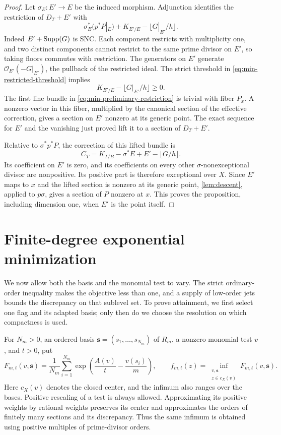 \begin{proof}
Let $\sigma_E:E'\longrightarrow E$ be the induced morphism. Adjunction identifies the restriction of $D_T+E'$ with
\begin{equation}
\label{eq:min-preliminary-restriction}
 \sigma_E^*(p^*P|_E)
   +K_{E'/E}-\lfloor G|_{E'}/h\rfloor.
\end{equation}
Indeed $E'+\operatorname{Supp}(G)$ is SNC. Each component restricts with multiplicity one, and two distinct components cannot restrict to the same prime divisor on $E'$, so taking floors commutes with restriction. The generators on $E'$ generate $\mathcal{O}_{E'}(-G|_{E'})$, the pullback of the restricted ideal. The strict threshold in \eqref{eq:min-restricted-threshold} implies
\[
 K_{E'/E}-\lfloor G|_{E'}/h\rfloor\geq0.
\]
The first line bundle in \eqref{eq:min-preliminary-restriction} is trivial with fiber $P_x$. A nonzero vector in this fiber, multiplied by the canonical section of the effective correction, gives a section on $E'$ nonzero at its generic point. The exact sequence for $E'$ and the vanishing just proved lift it to a section of $D_T+E'$.

Relative to $\sigma^*p^*P$, the correction of this lifted bundle is
\[
 C_T=K_{T/B}-\sigma^*E+E'-\lfloor G/h\rfloor.
\]
Its coefficient on $E'$ is zero, and its coefficients on every other $\sigma$-nonexceptional divisor are nonpositive. Its positive part is therefore exceptional over $X$. Since $E'$ maps to $x$ and the lifted section is nonzero at its generic point, \cref{lem:descent}, applied to $p\sigma$, gives a section of $P$ nonzero at $x$. This proves the proposition, including dimension one, when $E'$ is the point itself.
\end{proof}

\section{Finite-degree exponential minimization}
\label{sec:min-exponential}

We now allow both the basis and the monomial test to vary. The strict ordinary-order inequality makes the objective less than one, and a supply of low-order jets bounds the discrepancy on that sublevel set. To prove attainment, we first select one flag and its adapted basis; only then do we choose the resolution on which compactness is used.

For $N_m>0$, an ordered basis $\mathbf{s}=(s_1,\ldots,s_{N_m})$ of $R_m$, a nonzero monomial test $v$, and $t>0$, put
\begin{equation}
\label{eq:min-objective}
 F_{m,t}(v,\mathbf{s})
  =\frac1{N_m}\sum_{i=1}^{N_m}
       \exp\!\left(\frac{{A}(v)}t-\frac{v(s_i)}m\right),
 \qquad
 f_{m,t}(z)=\inf_{\substack{v,\mathbf{s}\\z\in c_X(v)}}
                F_{m,t}(v,\mathbf{s}).
\end{equation}
Here $c_X(v)$ denotes the closed center, and the infimum also ranges over the bases. Positive rescaling of a test is always allowed. Approximating its positive weights by rational weights preserves its center and approximates the orders of finitely many sections and its discrepancy. Thus the same infimum is obtained using positive multiples of prime-divisor orders.

